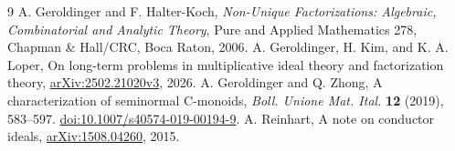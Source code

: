 \documentclass[11pt]{article}
\theoremstyle{definition}
\begin{document}
\newpage
\begin{thebibliography}{9}
 A. Geroldinger and F. Halter-Koch,
\emph{Non-Unique Factorizations: Algebraic, Combinatorial and Analytic Theory},
Pure and Applied Mathematics 278, Chapman \& Hall/CRC, Boca Raton, 2006.
 A. Geroldinger, H. Kim, and K. A. Loper,
On long-term problems in multiplicative ideal theory and factorization theory,
\href{https://arxiv.org/abs/2502.21020v3}{arXiv:2502.21020v3}, 2026.
 A. Geroldinger and Q. Zhong,
A characterization of seminormal C-monoids,
\emph{Boll. Unione Mat. Ital.} \textbf{12} (2019), 583--597.
\href{https://doi.org/10.1007/s40574-019-00194-9}{doi:10.1007/s40574-019-00194-9}.
 A. Reinhart, A note on conductor ideals,
\href{https://arxiv.org/abs/1508.04260}{arXiv:1508.04260}, 2015.
\end{thebibliography}
\end{document}
